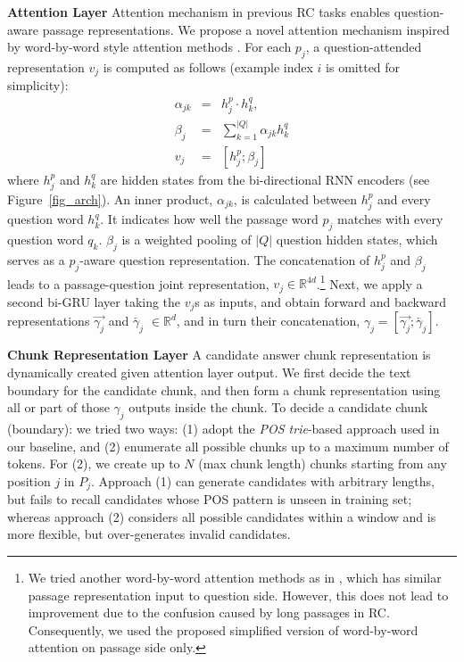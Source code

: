\documentclass[letterpaper]{article}
\begin{document}
\noindent\textbf{Attention Layer}
Attention mechanism in previous RC tasks \cite{kadlec2016text,hermann2015teaching,sordoni2016iterative,dhingra2016gated,cui2016aoa,cui2016consensus} enables question-aware passage representations. We propose a novel attention mechanism inspired by word-by-word style attention methods \cite{rocktaschel2015reasoning,wang2015learning,santos2016attentive}. For each $p_j$, a question-attended representation $v_j$ is computed as follows (example index $i$ is omitted for simplicity):
\begin{eqnarray}
\alpha_{jk} &=& h^p_j \cdot h^q_k, \ \\
\beta_j &=&\sum_{k=1}^{|Q|}{\alpha_{jk}h^q_k} \\
v_j &=& [h^p_j ; \beta_j]
\end{eqnarray}
where $h_j^p$ and $h_k^q$ are hidden states from the bi-directional RNN encoders (see Figure~\ref{fig_arch}). An inner product, $\alpha_{jk}$, is calculated between $h_j^p$ and every question word $h_k^q$. It indicates how well the passage word $p_j$ matches with every question word $q_k$. $\beta_j$ is a weighted pooling of $|Q|$ question hidden states, which serves as a $p_j$-aware question representation. The concatenation of $h_j^p$ and $\beta_j$ leads to a passage-question joint representation, $v_j \in \mathbb{R}^{4d}$.\footnote{We tried another word-by-word attention methods as in \cite{santos2016attentive}, which has similar passage representation input to question side. However, this does not lead to improvement due to the confusion caused by long passages in RC.
Consequently, we used the proposed simplified version of word-by-word attention on passage side only.} 
Next, we apply a second bi-GRU layer taking the $v_j$s as inputs,
and obtain forward and backward representations $\overrightarrow{\gamma_j}$ and $\overleftarrow{\gamma_j}$ $\in \mathbb{R}^d$, and in turn their concatenation, $\gamma_j=[\overrightarrow{\gamma_j};\overleftarrow{\gamma_j}]$.













\noindent\textbf{Chunk Representation Layer}
A candidate answer chunk representation is dynamically created given attention layer output. We first decide the text boundary for the candidate chunk, and then form a chunk representation using all or part of those $\gamma_j$ outputs inside the chunk. To decide a candidate chunk (boundary): we tried two ways: (1) adopt the \textit{POS trie}-based approach used in our baseline, and (2) enumerate all possible chunks up to a maximum number of tokens. For (2), we create up to $N$ (max chunk length) chunks starting from any position $j$ in $P_j$. Approach (1) can generate candidates with arbitrary lengths, but fails to recall candidates whose POS pattern is unseen in training set; whereas approach (2) considers all possible candidates within a window and is more flexible, but over-generates invalid candidates.
\end{document}
